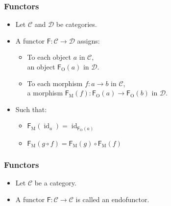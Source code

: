 \documentclass{beamer}
\DeclareMathOperator{\obj}{O}
\DeclareMathOperator{\mor}{M}
\DeclareMathOperator{\id}{id}
\newcommand{\idO}[1]{\natO{\id}{#1}}
\newcommand{\comp}{\ensuremath{\mathrel{\circ}}}
\newcommand{\cat}[1]{\ensuremath{\mathcal{#1}}}
\newcommand{\func}[1]{\ensuremath{\mathsf{#1}}}
\newcommand{\funcO}[1]{\ensuremath{\func{#1}_{\obj}}}
\newcommand{\funcM}[1]{\ensuremath{\func{#1}_{\mor}}}
\newcommand{\nat}[1]{\ensuremath{#1}}
\newcommand{\natO}[2]{\ensuremath{\nat{#1}_{#2}}}
\begin{document}
\begin{frame}[label={def:functor}]
  \frametitle{Functors}

  \begin{definition}[Functor]
    \begin{itemize}
    \item
      Let \cat{C} and \cat{D} be categories.
    \item
      A functor $\func{F}: \cat{C} \to \cat{D}$ assigns:
      \begin{itemize}
      \item
        To each object $a$ in \cat{C},\\ an object $\funcO{F}(a)$ in
        \cat{D}.
      \item
        To each morphism $f: a \to b$ in \cat{C},\\ a morphism
        $\funcM{F}(f): \funcO{F}(a) \to \funcO{F}(b)$ in \cat{D}.
      \end{itemize}
    \item
      Such that:
      \begin{itemize}
      \item
        $\funcM{F}(\idO{a}) = \idO{\funcO{F}(a)}$
      \item
        $\funcM{F}(g \comp f) = \funcM{F}(g) \comp \funcM{F}(f)$
      \end{itemize}
    \end{itemize}
  \end{definition}

\end{frame}


\begin{frame}[label={def:endofunctor}]
  \frametitle{Functors}

  \begin{definition}[Endofunctor]
    \begin{itemize}
    \item
      Let \cat{C} be a category.
    \item
      A functor $\func{F}: \cat{C} \to \cat{C}$ is called an
      endofunctor.
    \end{itemize}
  \end{definition}

\end{frame}

\end{document}
